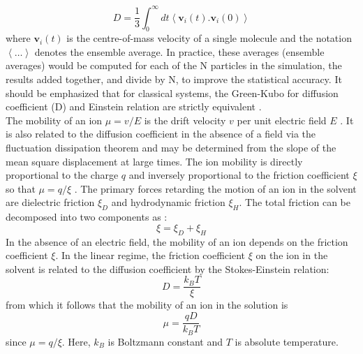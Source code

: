  \begin{equation}\label{GK}
 D = \frac{1}{3} \int_0^\infty dt \left\langle  \textbf{v}_i(t).\textbf{v}_i(0) \right\rangle
 \end{equation}
 \noindent where $\textbf{v}_i(t)$ is the centre-of-mass velocity of a single molecule and  the 
 notation $\left\langle \ldots \right\rangle$ denotes the ensemble average. In practice,  these averages (ensemble averages) would be computed for each of the N particles in the simulation, the results added together, and divide by N, to improve the statistical accuracy\cite{allen}. It should be emphasized that for classical systems, the Green-Kubo for diffusion coefficient (D) and Einstein relation are strictly equivalent \cite{frenkel}.\\
 The mobility of an ion $\mu =v/E$  is the drift velocity $v$ per unit electric field $E$ \cite{2, kittel}.  It is also related to the diffusion coefficient in the absence of a field via the fluctuation dissipation theorem and may be determined from the slope of the mean square displacement at large times. The ion mobility  is directly proportional to the charge $q$  and inversely proportional to the friction coefficient $\xi$  so that  $\mu = q/\xi$ . The primary forces retarding the motion of an ion in the solvent are dielectric friction $\xi_D$ and hydrodynamic friction $\xi_H$. The total friction can be decomposed into two components as \cite{3, 4}:
 \begin{equation}
 \xi = \xi_D + \xi_H 
 \end{equation}
 In the absence of an electric field, the mobility of an ion depends on the friction coefficient $\xi$. In the linear regime, the friction coefficient 
 $\xi$ on the ion in the solvent  is related to the diffusion coefficient  by the Stokes-Einstein relation\cite{2}:
 \begin{equation}
 D = \frac{k_BT}{\xi}
 \label{friction}
 \end{equation}
 from which it follows that the mobility of an ion in the solution is \cite{2, kittel} 
 \begin{equation}
 \mu =\frac{q D}{k_BT}
 \label{mobility}
 \end{equation}
 since $\mu =q/\xi$. Here, $k_B$ is Boltzmann constant and $T$ is absolute temperature.\\ 
    
    
